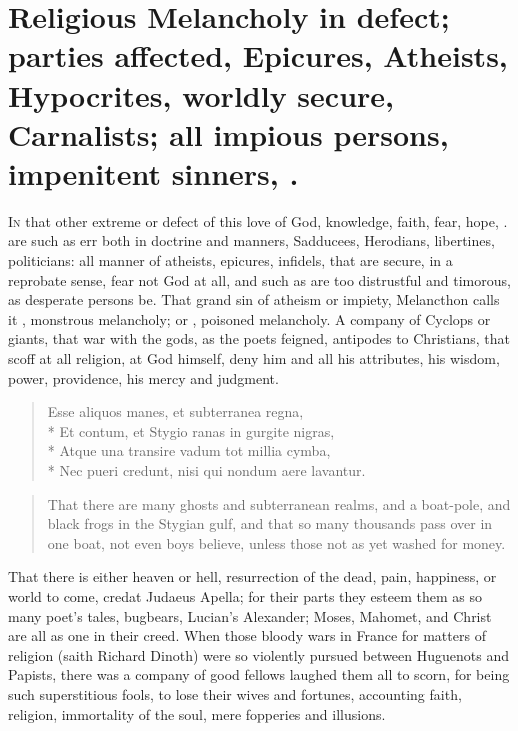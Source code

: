 {%

\section[Religious Melancholy in defect]{Religious Melancholy in defect; parties affected, Epicures, Atheists, Hypocrites, worldly secure, Carnalists; all impious persons, impenitent sinners, \etc{}.}

\lettrine{I}{n} that other extreme or defect of this love of God, knowledge, faith,
fear, hope, \etc{}. are such as err both in doctrine and manners,
Sadducees, Herodians, libertines, politicians: all manner of atheists,
epicures, infidels, that are secure, in a reprobate sense, fear not God
at all, and such as are too distrustful and timorous, as desperate persons
be. That grand sin of atheism or impiety, Melancthon calls it
, monstrous melancholy; or , poisoned melancholy. A company of Cyclops or giants, that
war with the gods, as the poets feigned, antipodes to Christians, that
scoff at all religion, at God himself, deny him and all his attributes,
his wisdom, power, providence, his mercy and judgment.

\begin{latin}
\begin{verse}
Esse aliquos manes, et subterranea regna,\\*
Et contum, et Stygio ranas in gurgite nigras,\\*
Atque una transire vadum tot millia cymba,\\*
Nec pueri credunt, nisi qui nondum aere lavantur.
\end{verse}
\end{latin}

\begin{quote}
 That there are many ghosts and subterranean realms, and a boat-pole, and black frogs in the Stygian gulf, and that so many thousands pass over in one boat, not even boys believe, unless those not as yet washed for money.
\end{quote}

That there is either heaven or hell, resurrection of the dead, pain,
happiness, or world to come, credat Judaeus Apella; for their parts
they esteem them as so many poet's tales, bugbears, Lucian's Alexander;
Moses, Mahomet, and Christ are all as one in their creed. When those
bloody wars in France for matters of religion (saith Richard
Dinoth) were so violently pursued between Huguenots and Papists, there
was a company of good fellows laughed them all to scorn, for being such
superstitious fools, to lose their wives and fortunes, accounting
faith, religion, immortality of the soul, mere fopperies and illusions.

}
